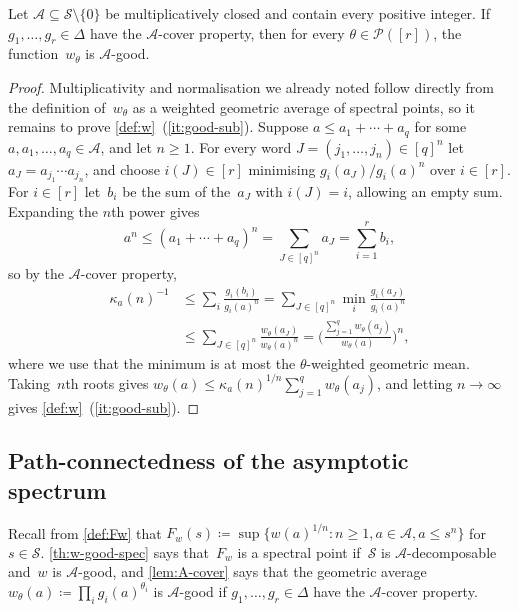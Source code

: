 \documentclass[11pt,letterpaper]{article}
\begin{document}
\begin{lemma}\label{lem:A-cover}
Let $\mathcal{A} \subseteq \mathcal{S} \setminus \{0\}$ be multiplicatively closed and contain every positive integer. If $g_1, \ldots, g_r \in \Delta$ have the $\mathcal{A}$-cover property, then for every $\theta \in \mathcal{P}([r])$, the function~$w_\theta$ is $\mathcal{A}$-good.
\end{lemma}
\begin{proof}
Multiplicativity and normalisation we already noted follow directly from the definition of~$w_\theta$ as a weighted geometric average of spectral points, so it remains to prove \cref{def:w}~(\ref{it:good-sub}). Suppose $a \leq a_1 + \cdots + a_q$ for some $a, a_1, \ldots, a_q \in \mathcal{A}$, and let $n \geq 1$. For every word $J = (j_1, \ldots, j_n) \in [q]^n$ let $a_J = a_{j_1} \cdots a_{j_n}$, and choose $i(J) \in [r]$ minimising $g_i(a_J)/g_i(a)^n$ over $i \in [r]$. For $i \in [r]$ let~$b_i$ be the sum of the~$a_J$ with $i(J) = i$, allowing an empty sum. Expanding the $n$th power gives
\[
a^n \leq (a_1 + \cdots + a_q)^n = \sum_{J \in [q]^n} a_J = \sum_{i=1}^r b_i,
\]
so by the $\mathcal{A}$-cover property,
\begin{align*}
\kappa_a(n)^{-1} &\leq \sum_i \frac{g_i(b_i)}{g_i(a)^n} = \sum_{J \in [q]^n} \min_i \frac{g_i(a_J)}{g_i(a)^n} \\
&\leq \sum_{J \in [q]^n} \frac{w_\theta(a_J)}{w_\theta(a)^n} = \biggl( \frac{\sum_{j=1}^q w_\theta(a_j)}{w_\theta(a)} \biggr)^n,
\end{align*}
where we use that the minimum is at most the $\theta$-weighted geometric mean. Taking~$n$th roots gives $w_\theta(a) \leq \kappa_a(n)^{1/n} \sum_{j=1}^q w_\theta(a_j)$, and letting $n \to \infty$ gives \cref{def:w}~(\ref{it:good-sub}).
\end{proof}

\subsection{Path-connectedness of the asymptotic spectrum}

Recall from \cref{def:Fw} that $F_w(s) \coloneqq \sup \{ w(a)^{1/n} : n \geq 1, a \in \mathcal{A}, a \leq s^n \}$ for $s \in \mathcal{S}$. \cref{th:w-good-spec} says that~$F_w$ is a spectral point if~$\mathcal{S}$ is $\mathcal{A}$-decomposable and~$w$ is $\mathcal{A}$-good, and \cref{lem:A-cover} says that the geometric average $w_\theta(a) \coloneqq \prod_i g_i(a)^{\theta_i}$ is $\mathcal{A}$-good if $g_1, \ldots, g_r \in \Delta$ have the $\mathcal{A}$-cover property. 
\end{document}
